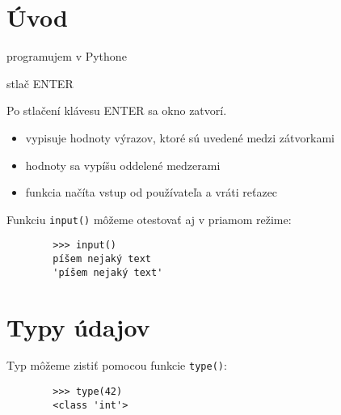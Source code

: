 \documentclass[a4paper,12pt]{article}
\begin{document}
	
	\section{Úvod}
	
	\begin{tcolorbox}
		programujem v Pythone
		
		stlač ENTER
	\end{tcolorbox}
	
	Po stlačení klávesu ENTER sa okno zatvorí.
	
	\begin{tcolorbox}[title=print()]
		\begin{itemize}
			\item vypisuje hodnoty výrazov, ktoré sú uvedené medzi zátvorkami
			\item hodnoty sa vypíšu oddelené medzerami
		\end{itemize}
	\end{tcolorbox}
	
	\begin{tcolorbox}[title=input()]
		\begin{itemize}
			\item funkcia načíta vstup od používateľa a vráti reťazec
		\end{itemize}
	\end{tcolorbox}
	
	Funkciu \texttt{input()} môžeme otestovať aj v priamom režime:
	
	\noindent
	\begin{verbatim}
		>>> input()
		píšem nejaký text
		'píšem nejaký text'
	\end{verbatim}
	
	\section{Typy údajov}
	
	Typ môžeme zistiť pomocou funkcie \texttt{type()}:
	
	\begin{verbatim}
		>>> type(42)
		<class 'int'>
	\end{verbatim}
	
\end{document}
